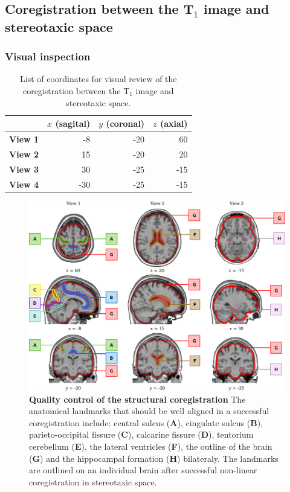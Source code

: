 \documentclass[12pt]{paper}%
\begin{document}
\subsection{Coregistration between the T$_1$ image and stereotaxic space}

\subsubsection{Visual inspection}
\begin{table}[htbp]
\centering
\captionsetup{justification=centering,margin=2cm}
 \begin{tabular}{c|rrr}
 & $x$ (sagital) & $y$ (coronal) & $z$ (axial)\\
  \hline
 \textbf{View 1} & -8 & -20 & 60\\
 \textbf{View 2} & 15 & -20 & 20\\
 \textbf{View 3} & 30 & -25 & -15\\
 \textbf{View 4} & -30 & -25 & -15\\
 \end{tabular} 
 \caption{List of coordinates for visual review of the coregistration between the T$_1$ image and stereotaxic space.}
 \label{tab_coord_t1}
\end{table}


\begin{figure}[htbp]
\begin{center}
\includegraphics[width=\linewidth]{fig_qc_t1}
\end{center}
\caption{
{\textbf{Quality control of the structural coregistration}} {The anatomical landmarks that should be well aligned in a successful coregistration include: central sulcus (\textbf{A}), cingulate sulcus (\textbf{B}), parieto-occipital fissure (\textbf{C}), calcarine fissure (\textbf{D}), tentorium cerebellum (\textbf{E}), the lateral ventricles (\textbf{F}), the outline of the brain (\textbf{G}) and the hippocampal formation (\textbf{H}) bilateraly. The landmarks are outlined on an individual brain after successful non-linear coregistration in stereotaxic space.}
}
\label{fig_qc_anat}
\end{figure}
\end{document}

